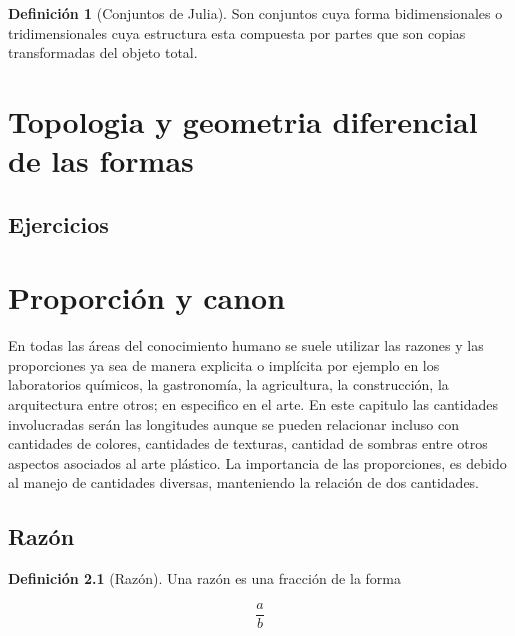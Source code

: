 \documentclass[
  11pt,
]{krantz}
\theoremstyle{definition}
\newtheorem{definition}{Definición}[chapter]
\theoremstyle{definition}
\theoremstyle{definition}
\theoremstyle{definition}
\theoremstyle{remark}
\begin{document}
\begin{definition}[Conjuntos de Julia]
\protect\hypertarget{def:julia}{}\label{def:julia}Son conjuntos cuya forma bidimensionales o tridimensionales cuya estructura esta compuesta por partes que son copias transformadas del objeto total.
\end{definition}

\hypertarget{topologia-y-geometria-diferencial-de-las-formas}{%
\chapter{Topologia y geometria diferencial de las formas}\label{topologia-y-geometria-diferencial-de-las-formas}}

\citep{vincze2014college}

\hypertarget{ejercicios}{%
\section{Ejercicios}\label{ejercicios}}

\hypertarget{appendix-apendice}{%
\appendix {}}


\hypertarget{intro}{%
\chapter{Proporción y canon}\label{intro}}

En todas las áreas del conocimiento humano se suele utilizar las razones y las proporciones ya sea de manera explicita o implícita por ejemplo en los laboratorios químicos, la gastronomía, la agricultura, la construcción, la arquitectura entre otros; en especifico en el arte. En este capitulo las cantidades involucradas serán las longitudes aunque se pueden relacionar incluso con cantidades de colores, cantidades de texturas, cantidad de sombras entre otros aspectos asociados al arte plástico. La importancia de las proporciones, es debido al manejo de cantidades diversas, manteniendo la relación de dos cantidades.

\hypertarget{razuxf3n}{%
\section{Razón}\label{razuxf3n}}

\begin{definition}[Razón]
\protect\hypertarget{def:razon}{}\label{def:razon}Una razón es una fracción de la forma

\[
\frac{a}{b}\label{eq:fraccion}
\]
\end{definition}
\end{document}
